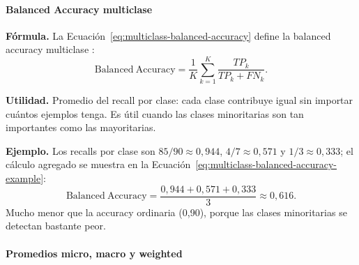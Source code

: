 \documentclass[12pt,oneside]{report}
\begin{document}
\paragraph{Balanced Accuracy multiclase}

\textbf{Fórmula.} La Ecuación~\eqref{eq:multiclass-balanced-accuracy} define la balanced accuracy multiclase \cite{brodersen2010,sokolova_lapalme_2009}:
\begin{equation}
\label{eq:multiclass-balanced-accuracy}
\mathrm{Balanced\ Accuracy}=\frac{1}{K}\sum_{k=1}^{K}\frac{TP_k}{TP_k+FN_k}.
\end{equation}

\textbf{Utilidad.} Promedio del recall por clase: cada clase contribuye
igual sin importar cuántos ejemplos tenga. Es útil cuando las clases
minoritarias son tan importantes como las mayoritarias.

\textbf{Ejemplo.} Los recalls por clase son $85/90\approx 0{,}944$,
$4/7\approx 0{,}571$ y $1/3\approx 0{,}333$; el cálculo agregado se muestra en la Ecuación~\eqref{eq:multiclass-balanced-accuracy-example}:
\begin{equation}
\label{eq:multiclass-balanced-accuracy-example}
\mathrm{Balanced\ Accuracy}=\frac{0{,}944+0{,}571+0{,}333}{3}\approx 0{,}616.
\end{equation}
Mucho menor que la accuracy ordinaria (0{,}90), porque las clases
minoritarias se detectan bastante peor.

\paragraph{Promedios micro, macro y weighted}
\end{document}
